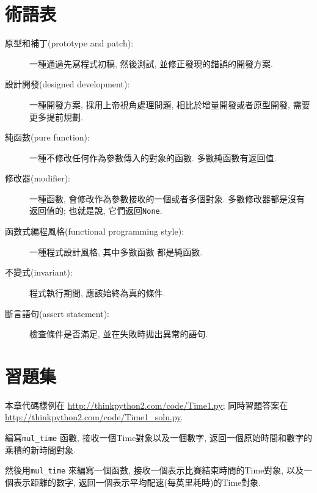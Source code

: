 \documentclass[10pt]{book}
\begin{document}
\section{術語表}

\begin{description}

\item[原型和補丁(prototype and patch):] 一種通過先寫程式初稿, 然後測試, 並修正發現的錯誤的開發方案. 

\item[設計開發(designed development):] 一種開發方案, 採用上帝視角處理問題, 
相比於增量開發或者原型開發, 需要更多提前規劃. 

\item[純函數(pure function):] 一種不修改任何作為參數傳入的對象的函數. 
多數純函數有返回值. 

\item[修改器(modifier):] 一種函數, 
會修改作為參數接收的一個或者多個對象. 
多數修改器都是沒有返回值的;
也就是說, 它們返回{\tt None}. 

\item[函數式編程風格(functional programming style):] 一種程式設計風格, 其中多數函數
都是純函數.

\item[不變式(invariant):] 程式執行期間, 應該始終為真的條件. 

\item[斷言語句(assert statement):] 檢查條件是否滿足, 並在失敗時拋出異常的語句. 

\end{description}


\section{習題集}

本章代碼樣例在
\url{http://thinkpython2.com/code/Time1.py}; 
同時習題答案在\url{http://thinkpython2.com/code/Time1_soln.py}.

\begin{exercise}

編寫\verb"mul_time" 函數, 接收一個Time對象以及一個數字, 
返回一個原始時間和數字的乘積的新時間對象. 

然後用\verb"mul_time" 來編寫一個函數, 接收一個表示比賽結束時間的Time對象, 
以及一個表示距離的數字, 返回一個表示平均配速(每英里耗時)的Time對象. 

\end{exercise}
\end{document}
